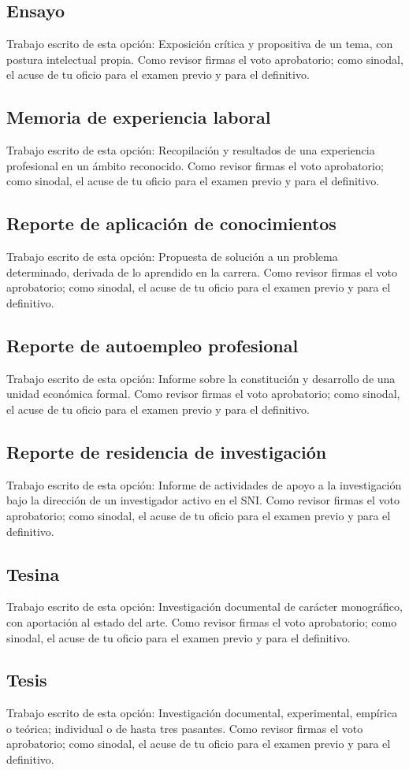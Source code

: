 \subsection{Ensayo}
Trabajo escrito de esta opción: Exposición crítica y propositiva de un tema, con postura intelectual propia. Como revisor firmas el voto aprobatorio; como sinodal, el acuse de tu oficio para el examen previo y para el definitivo.
\subsection{Memoria de experiencia laboral}
Trabajo escrito de esta opción: Recopilación y resultados de una experiencia profesional en un ámbito reconocido. Como revisor firmas el voto aprobatorio; como sinodal, el acuse de tu oficio para el examen previo y para el definitivo.
\subsection{Reporte de aplicación de conocimientos}
Trabajo escrito de esta opción: Propuesta de solución a un problema determinado, derivada de lo aprendido en la carrera. Como revisor firmas el voto aprobatorio; como sinodal, el acuse de tu oficio para el examen previo y para el definitivo.
\subsection{Reporte de autoempleo profesional}
Trabajo escrito de esta opción: Informe sobre la constitución y desarrollo de una unidad económica formal. Como revisor firmas el voto aprobatorio; como sinodal, el acuse de tu oficio para el examen previo y para el definitivo.
\subsection{Reporte de residencia de investigación}
Trabajo escrito de esta opción: Informe de actividades de apoyo a la investigación bajo la dirección de un investigador activo en el SNI. Como revisor firmas el voto aprobatorio; como sinodal, el acuse de tu oficio para el examen previo y para el definitivo.
\subsection{Tesina}
Trabajo escrito de esta opción: Investigación documental de carácter monográfico, con aportación al estado del arte. Como revisor firmas el voto aprobatorio; como sinodal, el acuse de tu oficio para el examen previo y para el definitivo.
\subsection{Tesis}
Trabajo escrito de esta opción: Investigación documental, experimental, empírica o teórica; individual o de hasta tres pasantes. Como revisor firmas el voto aprobatorio; como sinodal, el acuse de tu oficio para el examen previo y para el definitivo.
